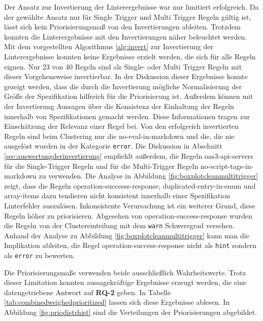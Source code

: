 Der Ansatz zur Invertierung der Linterergebnisse war nur limitiert erfolgreich. Da der gewählte Ansatz nur für Single Trigger und Multi Trigger Regeln gültig ist, lässt sich kein Priorisierungsmaß von den Invertierungen ableiten. Trotzdem konnten die Linterergebnisse mit den Invertierungen näher beleuchtet werden. Mit dem vorgestellten Algorithmus \ref{alg:invert} zur Invertierung der Linterergebnisse konnten keine Ergebnisse erzielt werden, die sich für alle Regeln eignen. Nur 23 von 40 Regeln sind als Single- oder Multi Trigger Regeln mit dieser Vorgehensweise invertierbar. In der Diskussion dieser Ergebnisse konnte gezeigt werden, dass die durch die Invertierung mögliche Normalisierung der Größe der Spezifikation hilfreich für die Priorisierung ist. Außerdem können mit der Invertierung Aussagen über die Konsistenz der Einhaltung der Regeln innerhalb von Spezifikationen gemacht werden. Diese Informationen tragen zur Einschätzung der Relevanz einer Regel bei. Von den erfolgreich invertierten Regeln sind beim Clustering nur die no-eval-in-markdown und die, die nie ausgelöst wurden in der Kategorie \texttt{error}. Die Diskussion in Abschnitt \ref{sec:auswertungderinvertierung} empfiehlt außerdem, die Regeln oas3-api-servers für die Single-Trigger Regeln und für die Multi-Trigger Regeln no-script-tags-in-markdown zu verwenden. Die Analyse in Abbildung \ref{fig:boxplotcleanmultitrigger} zeigt, dass die Regeln operation-successs-response, duplicated-entry-in-enum und array-items dazu tendieren nicht konsistent innerhalb einer Spezifikation Linterfehler auszulösen. Inkonsistente Verursachung ist ein weiterer Grund, diese Regeln höher zu priorisieren. Abgesehen von operation-success-response wurden die Regeln von der Clustereinteilung mit dem \texttt{warn} Schweregrad versehen. Anhand der Analyse zu Abbildung \ref{fig:boxplotcleanmultitrigger} kann man die Implikation ableiten, die Regel operation-success-response nicht als \texttt{hint} sondern als \texttt{error} zu bewerten.

Die Priorisierungsmaße verwenden beide ausschließlich Wahrheitswerte. Trotz dieser Limitation konnten aussagekräftige Ergebnisse erzeugt werden, die eine datengetriebene Antwort auf \textbf{RQ-2} geben. In Tabelle \ref{tab:combinedweighedprioritized} lassen sich diese Ergebnisse ablesen. In Abbildung \ref{fig:priodistrhist} sind die Verteilungen der Priorisierungen abgebildet. 

